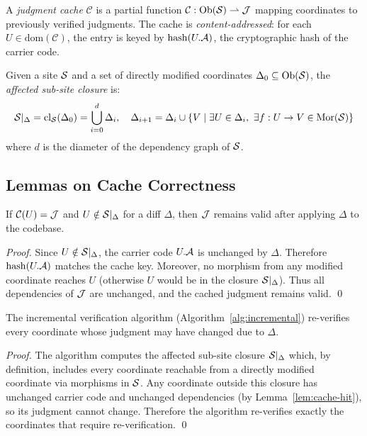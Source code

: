 \documentclass[11pt]{article}
\begin{document}
\begin{definition}
A \emph{judgment cache} $\mathcal{C}$ is a partial function
$\mathcal{C} : \mathrm{Ob}(\mathcal{S}) \rightharpoonup \mathcal{J}$ mapping coordinates to
previously verified judgments. The cache is \emph{content-addressed}: for each
$U \in \mathrm{dom}(\mathcal{C})$, the entry is keyed by
$\mathrm{hash}(U.\mathcal{A})$, the cryptographic hash of the carrier code.
\end{definition}

\begin{definition}
Given a site $\mathcal{S}$ and a set of directly modified coordinates
$\Delta_0 \subseteq \mathrm{Ob}(\mathcal{S})$, the \emph{affected sub-site closure} is:
\[
  \mathcal{S}|_\Delta = \mathrm{cl}_{\mathcal{S}}(\Delta_0) = \bigcup_{i=0}^{d}
    \Delta_i, \quad \Delta_{i+1} = \Delta_i \cup
    \{V \mid \exists U \in \Delta_i,\ \exists f : U \to V \in \mathrm{Mor}(\mathcal{S})\}
\]
where $d$ is the diameter of the dependency graph of $\mathcal{S}$.
\end{definition}

\subsection{Lemmas on Cache Correctness}

\begin{lemma}\label{lem:cache-hit}
If $\mathcal{C}(U) = \mathcal{J}$ and $U \notin \mathcal{S}|_\Delta$ for a diff $\Delta$,
then $\mathcal{J}$ remains valid after applying $\Delta$ to the codebase.
\end{lemma}

\begin{proof}
Since $U \notin \mathcal{S}|_\Delta$, the carrier code $U.\mathcal{A}$ is unchanged
by $\Delta$. Therefore $\mathrm{hash}(U.\mathcal{A})$ matches the cache key.
Moreover, no morphism from any modified coordinate reaches $U$ (otherwise $U$
would be in the closure $\mathcal{S}|_\Delta$). Thus all dependencies of $\mathcal{J}$ are
unchanged, and the cached judgment remains valid. \qed
\end{proof}

\begin{lemma}\label{lem:incr-complete}
The incremental verification algorithm (Algorithm~\ref{alg:incremental})
re-verifies every coordinate whose judgment may have changed due to $\Delta$.
\end{lemma}

\begin{proof}
The algorithm computes the affected sub-site closure $\mathcal{S}|_\Delta$ which,
by definition, includes every coordinate reachable from a directly modified
coordinate via morphisms in $\mathcal{S}$. Any coordinate outside this closure has
unchanged carrier code and unchanged dependencies (by
Lemma~\ref{lem:cache-hit}), so its judgment cannot change. Therefore the
algorithm re-verifies exactly the coordinates that require
re-verification. \qed
\end{proof}
\end{document}
